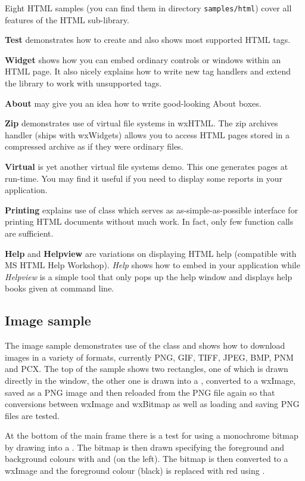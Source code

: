 Eight HTML samples (you can find them in directory {\tt samples/html})
cover all features of the HTML sub-library.

{\bf Test} demonstrates how to create 
and also shows most supported HTML tags.

{\bf Widget} shows how you can embed ordinary controls or windows within an
HTML page. It also nicely explains how to write new tag handlers and extend
the library to work with unsupported tags.

{\bf About} may give you an idea how to write good-looking About boxes.

{\bf Zip} demonstrates use of virtual file systems in wxHTML. The zip archives
handler (ships with wxWidgets) allows you to access HTML pages stored
in a compressed archive as if they were ordinary files.

{\bf Virtual} is yet another virtual file systems demo. This one generates pages at run-time.
You may find it useful if you need to display some reports in your application.

{\bf Printing} explains use of 
class which serves as as-simple-as-possible interface for printing HTML
documents without much work. In fact, only few function calls are sufficient.

{\bf Help} and {\bf Helpview} are variations on displaying HTML help
(compatible with MS HTML Help Workshop). {\it Help} shows how to embed
 in your application
while {\it Helpview} is a simple tool that only pops up the help window and
displays help books given at command line.


\subsection{Image sample}\label{sampleimage}

The image sample demonstrates use of the  class
and shows how to download images in a variety of formats, currently PNG, GIF,
TIFF, JPEG, BMP, PNM and PCX. The top of the sample shows two rectangles, one
of which is drawn directly in the window, the other one is drawn into a
, converted to a wxImage, saved as a PNG image
and then reloaded from the PNG file again so that conversions between wxImage
and wxBitmap as well as loading and saving PNG files are tested.

At the bottom of the main frame there is a test for using a monochrome bitmap by
drawing into a . The bitmap is then drawn
specifying the foreground and background colours with
 and
 (on the left). The
bitmap is then converted to a wxImage and the foreground colour (black) is
replaced with red using .


